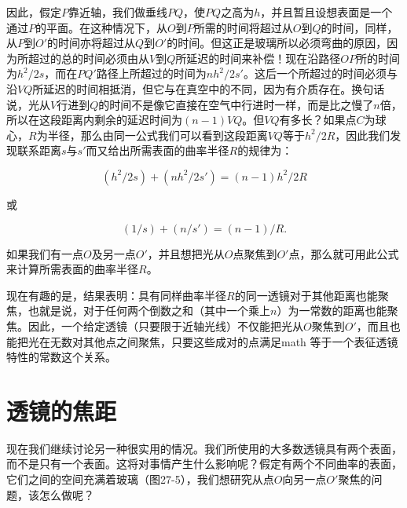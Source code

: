 \documentclass[12pt,oneside]{book}
\begin{document}
\begin{common-format}
因此，假定$ P $靠近轴，我们做垂线$ PQ $，使$ PQ $之高为$ h $，并且暂且设想表面是一个通过$ P $的平面。在这种情况下，从$ O $到$ P $所需的时间将超过从$ O $到$ Q $的时间，同样，从$ P $到$ O' $的时间亦将超过从$ Q $到$ O' $的时间。但这正是玻璃所以必须弯曲的原因，因为所超过的总的时间必须由从$ V $到$ Q $所延迟的时间来补偿！现在沿路径$ OP $所的时间为$ h^2/2s $，而在$ PQ' $路径上所超过的时间为$ nh^2/2s' $。这后一个所超过的时间必须与沿$ VQ $所延迟的时间相抵消，但它与在真空中的不同，因为有介质存在。换句话说，光从$ V $行进到$ Q $的时间不是像它直接在空气中行进时一样，而是比之慢了$ n $倍，所以在这段距离内剩余的延迟时间为$ (n - 1)VQ $。但$ VQ $有多长？如果点$ C $为球心，$ R $为半径，那么由同一公式我们可以看到这段距离$ VQ $等于$ h^2/2R $，因此我们发现联系距离$ s $与$ s' $而又给出所需表面的曲率半径$ R $的规律为：

\begin{equation}
\label{Eq:I:27:2}
(h^2/2s) + (nh^2/2s') = (n-1)h^2/2R
\end{equation}

或

\begin{equation}
\label{Eq:I:27:3}
(1/s)+(n/s')=(n-1)/R.
\end{equation}

如果我们有一点$ O $及另一点$ O' $，并且想把光从$ O $点聚焦到$ O' $点，那么就可用此公式来计算所需表面的曲率半径$ R $。

现在有趣的是，结果表明：具有同样曲率半径$R$的同一透镜对于其他距离也能聚焦，也就是说，对于任何两个倒数之和（其中一个乘上$n$）为一常数的距离也能聚焦。因此，一个给定透镜（只要限于近轴光线）不仅能把光从$O$聚焦到$O'$，而且也能把光在无数对其他点之间聚焦，只要这些成对的点满足math
等于一个表征透镜特性的常数这个关系。






\section{透镜的焦距}
现在我们继续讨论另一种很实用的情况。我们所使用的大多数透镜具有两个表面，而不是只有一个表面。这将对事情产生什么影响呢？假定有两个不同曲率的表面，它们之间的空间充满着玻璃（图27-5），我们想研究从点$ O $向另一点$ O' $聚焦的问题，该怎么做呢？


\end{common-format}
\end{document}
